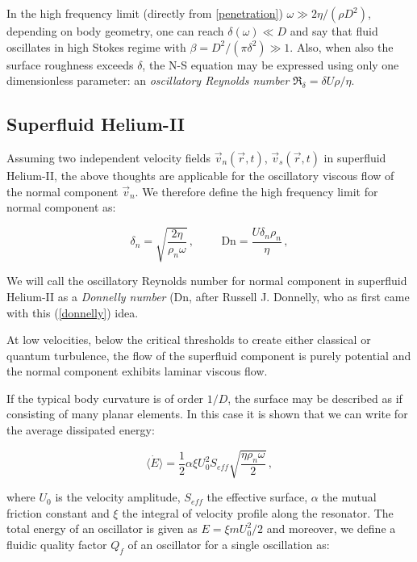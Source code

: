 In the high frequency limit (directly from \ref{penetration}) $\omega \gg 2\eta / (\rho D^2)$, depending on body geometry, one can reach $\delta(\omega) \ll D$ and say that fluid oscillates in
high Stokes regime \cite{universal_scaling} with $\beta = D^2 / (\pi \delta^2) \gg 1 $. Also, when also the surface roughness exceeds $\delta$, the N-S equation may be expressed using only one dimensionless parameter: an \textit{oscillatory Reynolds number} $\Re_{\delta} = \delta U \rho / \eta$.

\subsection*{Superfluid Helium-II}

Assuming two independent velocity fields $\vec{v}_n (\vec{r}, t)$, $\vec{v}_s (\vec{r}, t)$ in superfluid Helium-II, the above thoughts are applicable for the oscillatory viscous flow of the normal component $\vec{v}_n$. We therefore define the high frequency limit for normal component as:

\begin{equation}
\delta_n = \sqrt{\frac{2\eta}{\rho_n\omega}}\,,
\hspace{1cm}
\text{Dn} = \frac{U \delta_n \rho_n}{\eta}
\label{donnelly}\,,
\end{equation}

We will call the oscillatory Reynolds number for normal component in superfluid Helium-II as a \textit{Donnelly number} (Dn, after Russell J. Donnelly, who as first came with this (\ref{donnelly}) idea.

At low velocities, below the critical thresholds to create either classical or quantum turbulence, the flow of the superfluid component is purely potential and the normal component exhibits laminar viscous flow.

If the typical body curvature is of order $1/D$, the surface may be described as if consisting of many planar elements. In this case it is shown \cite{universal_scaling} that we can write for the average dissipated energy:

\begin{equation}
\langle \dot{E} \rangle =
\frac{1}{2} \alpha \xi U_0^2 S_{eff} \sqrt{\frac{\eta \rho_n \omega}{2}}\,,
\label{energy_loss}
\end{equation}

where $U_0$ is the velocity amplitude, $S_{eff}$ the effective surface, $\alpha$ the mutual friction constant and $\xi$ the integral of velocity profile along the resonator. The total energy of an oscillator is given as $E = \xi m U_0^2 / 2$ and moreover, we define a fluidic quality factor $Q_f$ of an oscillator for a single oscillation as:

